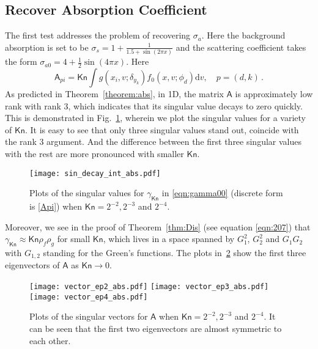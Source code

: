 \documentclass[english,reqno]{amsart}
\theoremstyle{plain}
\theoremstyle{definition} %
\newcommand{\Amat}{\mathsf{A}}
\newcommand{\rd}{\mathrm{d}}
\newcommand{\Kn}{\mathsf{Kn}}
\begin{document}
\subsection{Recover Absorption Coefficient}
The first test addresses the problem of recovering $\sigma_a$. Here the background absorption is set to be $\sigma_{s}=1+\frac{1}{1.5+\sin(2\pi x)}$ and the scattering coefficient takes the form $\sigma_{a0} = 4+\frac{1}{2}\sin(4\pi x)$. Here 
\begin{equation} \label{Api}
\Amat_{pi} = \Kn \int g(x_i,v; \delta_{y_k}) f_0(x,v; \phi_d) \rd{v}, \quad p = (d,k)\,.
\end{equation}
As predicted in Theorem~\ref{theorem:abs}, in 1D, the matrix $\Amat$ is approximately low rank with rank 3, which indicates that its singular value decays to zero quickly. This is demonstrated in Fig.~\ref{fig:sin_decay_int_abs}, wherein we plot the singular values for a variety of $\Kn$. It is easy to see that only three singular values stand out, coincide with the rank 3 argument. And the difference between the first three singular values with the rest are more pronounced with smaller $\Kn$. 
\begin{figure}[htp]
\centering
  \texttt{[image: sin\_decay\_int\_abs.pdf]}
  \caption{Plots of the singular values for $\gamma_\Kn$ in \eqref{eqn:gamma00} (discrete form is \eqref{Api}) when $\Kn=2^{-2},2^{-3}$ and $2^{-4}$.}
  \label{fig:sin_decay_int_abs}
\end{figure}

Moreover, we see in the proof of Theorem~\ref{thm:Dis} (see equation \eqref{eqn:207}) that $\gamma_\Kn \approx \Kn \rho_f \rho_g$ for small $\Kn$, which lives in a space spanned by $G^2_1$, $G^2_2$ and $G_1G_2$ with $G_{1,2}$ standing for the Green's functions. The plots in~\ref{fig:vectors_int_abs} show the first three eigenvectors of $\Amat$ as $\Kn\to0$.
\begin{figure}[htp]
\centering
  \texttt{[image: vector\_ep2\_abs.pdf]}
  \texttt{[image: vector\_ep3\_abs.pdf]}
  \texttt{[image: vector\_ep4\_abs.pdf]}
  \caption{Plots of the singular vectors for $\Amat$ when $\Kn=2^{-2},2^{-3}$ and $2^{-4}$. It can be seen that the first two eigenvectors are almost symmetric to each other. }
  \label{fig:vectors_int_abs}
\end{figure}
\end{document}
